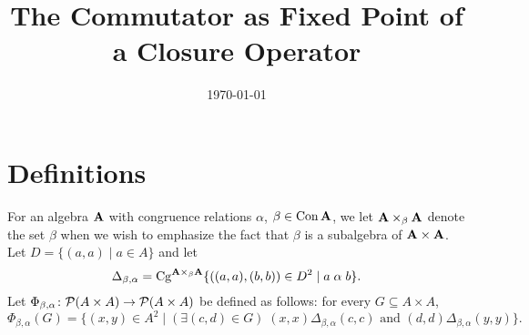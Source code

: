 \documentclass[11pt]{amsart}
\numberwithin{equation}{section}
\theoremstyle{plain}
\theoremstyle{definition}
\begin{document}
\title[Commutator as Fixed Point]{The Commutator as Fixed Point of a Closure Operator}
\date{\today}
\address{University of Hawaii}


\maketitle

\renewcommand{\etaR}{\ensuremath{\eta}}


\section{Definitions}
\label{sec:defs}
For an algebra $\mathbf{A}$ with congruence relations $\alpha$, $\beta\in \operatorname{Con}\mathbf{A}$, we 
let $\mathbf{A} \times_\beta \mathbf{A}$ denote the set $\beta$ when we wish to emphasize
the fact that $\beta$ is a subalgebra of $\mathbf{A}\times \mathbf{A}$.
Let $D = \{(a,a) \mid a\in A\}$ and let
\[\Delta_{\beta, \alpha} = \operatorname{Cg}^{\mathbf{A}\times_\beta \mathbf{A}}\{((a,a),(b,b))\in D^2 \mid a \mathrel{\alpha} b\}.\]
Let $\Phi_{\beta, \alpha} \colon \mathcal{P}(A\times A) \to \mathcal{P}(A\times A)$ be defined as
follows: for every $G \subseteq A\times A$,
\begin{equation}
  \label{eq:6}
\Phi_{\beta, \alpha}(G) = \{(x,y) \in A^2 \mid  (\exists (c,d) \in G) \;
(x,x) \mathrel{\Delta_{\beta, \alpha}} (c,c) \text{ and }
(d,d) \mathrel{\Delta_{\beta, \alpha}} (y,y)\}.
\end{equation}
\newcommand{\Phiba}{\ensuremath{\Phi}}
\end{document}
